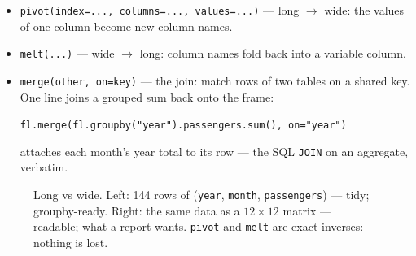 \begin{itemize}
\item \texttt{pivot(index=..., columns=..., values=...)} --- long $\to$ wide:
  the values of one column become new column names.
\item \texttt{melt(...)} --- wide $\to$ long: column names fold back into a
  variable column.
\item \texttt{merge(other, on=key)} --- the join: match rows of two tables on
  a shared key. One line joins a grouped sum back onto the frame:
  \par\texttt{fl.merge(fl.groupby("year").passengers.sum(), on="year")}
  \par\noindent attaches each month's year total to its row --- the SQL
  \texttt{JOIN} on an aggregate, verbatim.
\end{itemize}

\begin{figure}[ht]\centering
{}
\caption{Long vs wide. Left: 144 rows of (\texttt{year}, \texttt{month},
\texttt{passengers}) --- tidy; groupby-ready. Right: the same data as a
$12\times12$ matrix --- readable; what a report wants. \texttt{pivot} and
\texttt{melt} are exact inverses: nothing is lost.}\label{fig:long-wide}
\end{figure}



